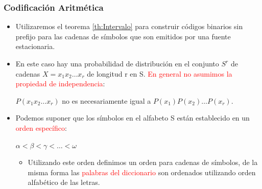 \documentclass{beamer}
\theoremstyle{plain}
\theoremstyle{example}
\theoremstyle{example}
\begin{document}
\begin{frame} \frametitle{Codificación Aritmética} \small 

\begin{itemize}
\item Utilizaremos el teorema \ref{th:Intervalo} para construir códigos binarios sin prefijo para las cadenas de símbolos que son emitidos por una fuente estacionaria.

\item En este caso hay una probabilidad de distribución en el conjunto $S^r$ de cadenas $X= x_1 x_2 \ldots x_r$ de longitud r en S. \textcolor{red}{En general no asumimos la propiedad de independencia}:

\begin{center}
$P(x_1x_2 \ldots x_r)$ no es necesariamente igual a $P(x_1)P(x_2)\ldots P(x_r)$.
\end{center}

\item Podemos suponer que los símbolos en el alfabeto S están establecido en un \textcolor{red}{orden específico}:

\begin{center}
$\alpha < \beta < \gamma < \ldots < \omega$
\end{center}

\begin{itemize}
\item Utilizando este orden definimos un orden para cadenas de símbolos, de la misma forma las \textcolor{red}{palabras del diccionario} son ordenados utilizando orden alfabético de las letras.
\end{itemize}

\end{itemize}
  
\end{frame} 
\end{document}
